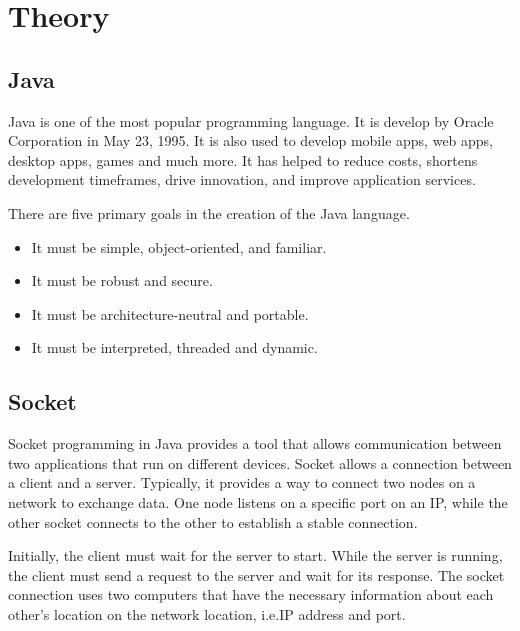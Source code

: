 \chapter{Theory}\label{ch:theory}
\section{Java}\label{sec:java}
    Java is one of the most popular programming language.
    It is develop by Oracle Corporation in May 23, 1995.
    It is also used to develop mobile apps, web apps, desktop apps, games and much more.
    It has helped to reduce costs, shortens development timeframes, drive innovation,
    and improve application services.
    \medskip

    \noindent
    There are five primary goals in the creation of the Java language.
    \begin{itemize}
        \item It must be simple, object-oriented, and familiar.
        \item It must be robust and secure.
        \item It must be architecture-neutral and portable.
        \item It must be interpreted, threaded and dynamic.
    \end{itemize}


    \section{Socket}\label{sec:socket}
    Socket programming in Java provides a tool that allows communication between two applications
    that run on different devices.
    Socket allows a connection between a client and a server.
    Typically, it provides a way to connect two nodes on a network to exchange data.
    One node listens on a specific port on an IP, while the other socket connects to the other to
    establish a stable connection.
    \medskip

    \noindent
    Initially, the client must wait for the server to start.
    While the server is running, the client must send a request to the server and wait for its
    response.
    The socket connection uses two computers that have the necessary information about each
    other's location on the network location, i.e.IP address and port.
    \medskip

